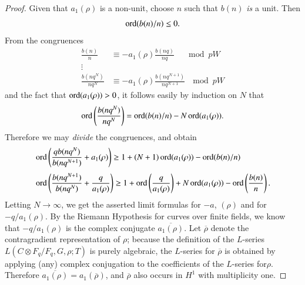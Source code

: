 \begin{proof}
Given that $a_{1}(\rho)$ is a non-unit, choose $n$ such that $b(n)$ {\em is} a unit. Then
$$
\operatorname{ord} (b(n)/n)\leq 0.
$$
From the congruences
\begin{align*}
\frac{b(n)}{n} &\equiv -a_{1}(\rho)\frac{b(nq)}{nq}\quad \mod pW\\
\vdots\quad & \\
\frac{b(nq^{N})}{nq^{N}} &\equiv -a_{1}(\rho)\frac{b(nq^{N+1})}{nq^{N+1}} \ \mod pW
\end{align*}
and the fact that $\operatorname{ord}(a_{1}(\rho))>0$, it follows easily by induction on $N$ that
$$
\operatorname{ord}\left(\frac{b(nq^{N})}{nq^{N}}\right)=\operatorname{ord}(b(n)/n)-N\operatorname{ord} (a_{1}(\rho)).
$$
Therefore we may {\em divide} the congruences, and obtain 
\begin{align*}
& \operatorname{ord}\left(\frac{qb(nq^{N})}{b(nq^{N+1})}+a_{1}(\rho)\right)\geq 1+(N+1)\operatorname{ord}(a_{1}(\rho))-\operatorname{ord}(b(n)/n)\\[3pt]
& \operatorname{ord}\left(\frac{b(nq^{N+1})}{b(nq^{N})}+\frac{q}{a_{1}(\rho)}\right)\geq 1+\operatorname{ord}\left(\frac{q}{a_{1}(\rho)}\right)+N\operatorname{ord}(a_{1}(\rho))-\operatorname{ord}\left(\frac{b(n)}{n}\right).
\end{align*}
Letting $N\to \infty$, we get the asserted limit formulas for $-a$, $(\rho)$ and for $-q/a_{1}(\rho)$. By the Riemann Hypothesis for curves over finite fields, we know that $-q/a_{1}(\rho)$ is the complex conjugate $\overline{a_{1}(\rho)}$. Let $\overline{\rho}$ denote the contragradient representation of $\rho$; because the definition of the $L$-series $L(C\otimes F_{q}/F_{q},G,\rho;T)$ is purely algebraic, the $L$-series for $\overline{\rho}$ is obtained by applying (any) complex conjugation to the coefficients of the $L$-series for\pageoriginale $\rho$. Therefore $\overline{a_{1}(\rho)}=a_{1}(\overline{\rho})$, and $\overline{\rho}$ also occurs in $H^{1}$ with multiplicity one.
\end{proof}

